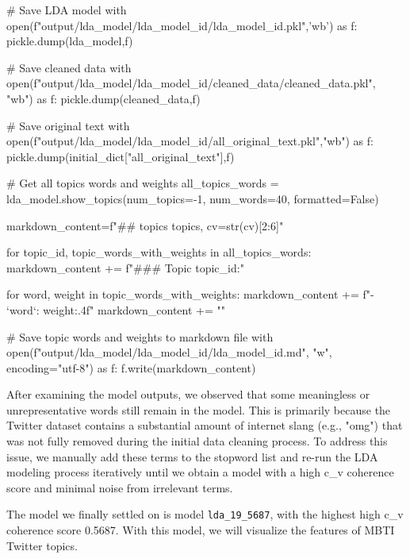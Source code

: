 \documentclass[12pt]{article}
\numberwithin{figure}{section}  %
\begin{document}
\begin{python}
# Save LDA model
with open(f"output/lda_model/lda_{model_id}/lda_{model_id}.pkl",'wb') as f:
    pickle.dump(lda_model,f)

# Save cleaned data
with open(f"output/lda_model/lda_{model_id}/cleaned_data/cleaned_data.pkl", "wb") as f:
    pickle.dump(cleaned_data,f)

# Save original text
with open(f"output/lda_model/lda_{model_id}/all_original_text.pkl","wb") as f:
        pickle.dump(initial_dict["all_original_text"],f)
        
# Get all topics words and weights
all_topics_words = lda_model.show_topics(num_topics=-1, num_words=40, formatted=False)

markdown_content=f"## {topics} topics, cv={str(cv)[2:6]}\n\n"

for topic_id, topic_words_with_weights in all_topics_words:
        markdown_content += f"### Topic {topic_id}:\n" 
        
        
        for word, weight in topic_words_with_weights:
            markdown_content += f"- `{word}`: {weight:.4f}\n"
        markdown_content += "\n" 

# Save topic words and weights to markdown file
with open(f"output/lda_model/lda_{model_id}/lda_{model_id}.md", "w", encoding="utf-8") as f:
        f.write(markdown_content)
	\end{python}
	
	After examining the model outputs, we observed that some meaningless or
	unrepresentative words still remain in the model. This is primarily because
	the Twitter dataset contains a substantial amount of internet slang (e.g., "omg") that was not
	fully removed during the initial data cleaning process. To address this
	issue, we manually add these terms to the stopword list and re-run the LDA
	modeling process iteratively until we obtain a model with a high c\_v
	coherence score and minimal noise from irrelevant terms.
	
	The model we finally settled on is model \texttt{lda\_19\_5687}, with the highest high
	c\_v coherence score 0.5687. With this model, we will visualize the features
	of MBTI Twitter topics.
	
	
\end{document}
